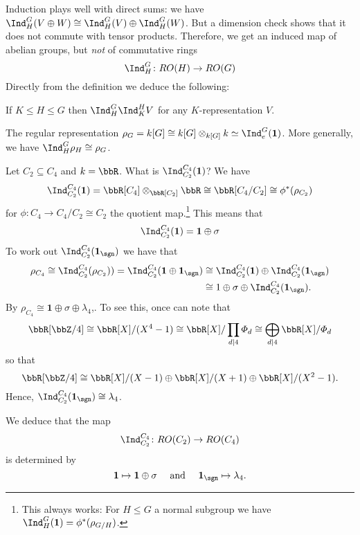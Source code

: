 \documentclass{willowtreebook}
\begin{document}
\begin{remark}
    Induction plays well with direct sums: we have $\Ind_H^G(V \oplus W) \cong \Ind_H^G(V) \oplus \Ind_H^G(W)$. But a dimension check shows that it does not commute with tensor products. Therefore, we get an induced map of abelian groups, but \emph{not} of commutative rings
    \[
\Ind_H^G \colon RO(H) \to RO(G)
    \]
    Directly from the definition we deduce the following:
\end{remark}
\begin{lemma}
If $K \le H \le G$ then $\Ind_H^G\Ind_K^H V$ for any $K$-representation $V$. 
\end{lemma}
\begin{example}
    The regular representation $\rho_G = k[G] \cong k[G] \otimes_{k[G]} k \simeq \Ind_e^G(\mathbf{1})$. More generally, we have $\Ind_H^G\rho_H \cong \rho_G$. 
\end{example}
\begin{example}
    Let $C_2 \subseteq C_4$ and $k = \bbR$. What is $\Ind_{C_2}^{C_4}(\mathbf{1})$? We have
    \[
\Ind_{C_2}^{C_4}(\mathbf{1}) = \bbR[C_4] \otimes_{\bbR[C_2]}\bbR \cong \bbR[C_4/C_2] \cong \phi^*(\rho_{C_2})
    \]
    for $\phi \colon C_4 \to C_4/C_2 \cong C_2$ the quotient map.\footnote{This always works: For $H \le G$ a normal subgroup we have $\Ind_H^G(\mathbf{1}) = \phi^*(\rho_{G/H})$.} This means that
    \[
\Ind_{C_2}^{C_4}(\mathbf{1}) = \mathbf{1} \oplus \sigma
    \]
    To work out $\Ind_{C_2}^{C_4}(\mathbf{1}_{\sgn})$ we have that
    \[
    \begin{split}
  \rho_{C_4} \cong \Ind_{C_2}^{C_4}(\rho_{C_2})) = \Ind_{C_2}^{C_4}(\mathbf{1} \oplus \mathbf{1}_{\sgn}) &\cong \Ind_{C_2}^{C_4}(\mathbf{1}) \oplus \Ind_{C_2}^{C_4}(\mathbf{1}_{\sgn})\\ &  \cong 1 \oplus \sigma  \oplus \Ind_{C_2}^{C_4}(\mathbf{1}_{\sgn}) .
  \end{split}
    \]
    By $\rho_{C_4} \cong \mathbf{1} \oplus \sigma \oplus \lambda_4$,. To see this, once can note that
    \[
    \bbR[\bbZ/4] \cong \bbR[X]/(X^4-1) \cong \bbR[X]/\prod_{d \mid 4} \Phi_d \cong \bigoplus_{d \mid 4}\bbR[X]/\Phi_d
    \]
    so that
    \[
\bbR[\bbZ/4] \cong \bbR[X]/(X-1) \oplus \bbR[X]/(X+1) \oplus \bbR[X]/(X^2-1). 
    \]
Hence, 
    $\Ind_{C_2}^{C_4}(\mathbf{1}_{\sgn}) \cong \lambda_4$. 
    
    We deduce that the map
    \[
    \Ind_{C_2}^{C_4} \colon RO(C_2) \to RO(C_4)
    \]
    is determined by
    \[
    \mathbf{1} \mapsto \mathbf{1} \oplus \sigma \quad \text{ and } \quad \mathbf{1}_{\sgn} \mapsto \lambda_4.
    \]
    \end{example}
\end{document}
